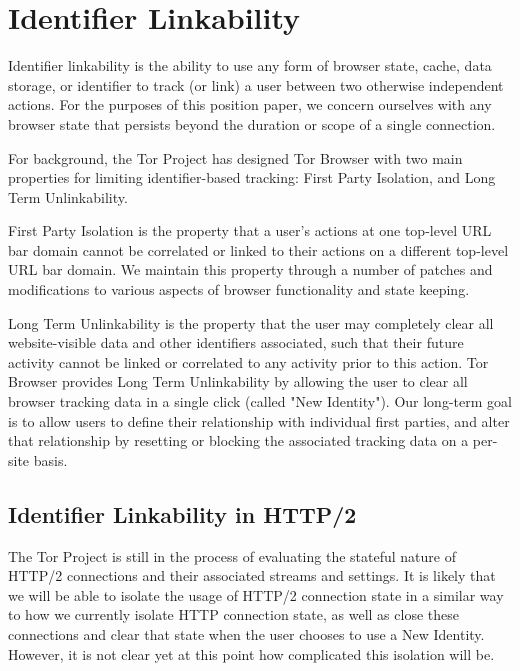 \documentclass[letterpaper,11pt]{llncs}
\begin{document}
\section{Identifier Linkability}

Identifier linkability is the ability to use any form of browser state, cache,
data storage, or identifier to track (or link) a user between two otherwise
independent actions. For the purposes of this position paper, we concern
ourselves with any browser state that persists beyond the duration or scope of
a single connection.

For background, the Tor Project has designed Tor Browser with two main
properties for limiting identifier-based tracking: First Party Isolation, and
Long Term Unlinkability.

First Party Isolation is the property that a user's actions at one
top-level URL bar domain cannot be correlated or linked to their actions on a
different top-level URL bar domain. We maintain this property through a number
of patches and modifications to various aspects of browser functionality and
state keeping.

Long Term Unlinkability is the property that the user may completely clear all
website-visible data and other identifiers associated, such that their future
activity cannot be linked or correlated to any activity prior to this action.
Tor Browser provides Long Term Unlinkability by allowing the user to clear all
browser tracking data in a single click (called "New Identity"). Our long-term
goal is to allow users to define their relationship with individual first
parties, and alter that relationship by resetting or blocking the associated
tracking data on a per-site basis.

\subsection{Identifier Linkability in HTTP/2}

The Tor Project is still in the process of evaluating the stateful nature of
HTTP/2 connections and their associated streams and settings. It is likely
that we will be able to isolate the usage of HTTP/2 connection state in a
similar way to how we currently isolate HTTP connection state, as well as
close these connections and clear that state when the user chooses to use a
New Identity. However, it is not clear yet at this point how complicated this
isolation will be.
\end{document}
